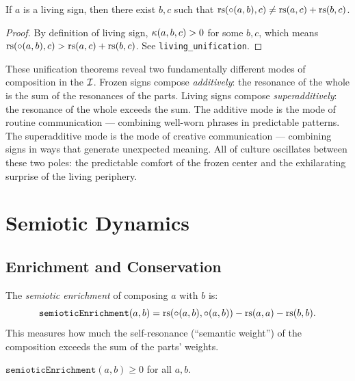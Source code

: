 \begin{theorem}
\label{thm:living-emergence}
If $a$ is a living sign, then there exist $b, c$ such that
$\mathrm{rs}(\circ(a,b), c) \neq \mathrm{rs}(a,c) + \mathrm{rs}(b,c)$.
\end{theorem}

\begin{proof}
By definition of living sign, $\kappa(a,b,c) > 0$ for some $b, c$,
which means $\mathrm{rs}(\circ(a,b), c) > \mathrm{rs}(a,c) + \mathrm{rs}(b,c)$. See
\texttt{living\_unification}.
\end{proof}

\begin{interpretation}
These unification theorems reveal two fundamentally different modes
of composition in the $\mathcal{I}$. Frozen signs compose \emph{additively}:
the resonance of the whole is the sum of the resonances of the parts.
Living signs compose \emph{superadditively}: the resonance of the
whole exceeds the sum. The additive mode is the mode of routine
communication --- combining well-worn phrases in predictable patterns.
The superadditive mode is the mode of creative communication ---
combining signs in ways that generate unexpected meaning. All of
culture oscillates between these two poles: the predictable comfort
of the frozen center and the exhilarating surprise of the living
periphery.
\end{interpretation}

\section{Semiotic Dynamics}

\subsection{Enrichment and Conservation}

\begin{definition}
\label{def:enrichment}
The \emph{semiotic enrichment} of composing $a$ with $b$ is:
\[
  \texttt{semioticEnrichment}(a, b) = \mathrm{rs}(\circ(a,b), \circ(a,b))
  - \mathrm{rs}(a,a) - \mathrm{rs}(b,b).
\]
This measures how much the self-resonance (``semantic weight'') of the
composition exceeds the sum of the parts' weights.
\end{definition}

\begin{theorem}
\label{thm:enrichment-nonneg}
$\texttt{semioticEnrichment}(a, b) \geq 0$ for all $a, b$.
\end{theorem}

